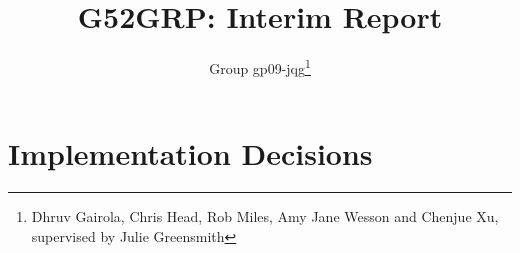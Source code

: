 \documentclass[12pt, a4paper]{article}
\title{G52GRP: Interim Report}
\author{Group gp09-jqg\thanks{Dhruv Gairola, Chris Head, Rob Miles, Amy Jane Wesson and Chenjue Xu, supervised by Julie Greensmith}} %
\begin{document}
\maketitle

\tableofcontents
\vfill


\section{Implementation Decisions}

\end{document}

